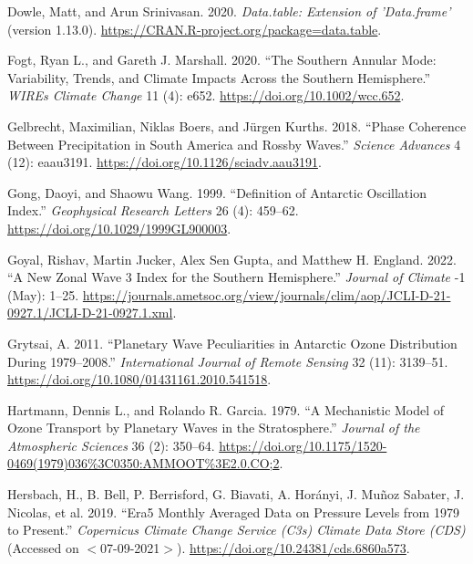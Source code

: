\documentclass[smallextended]{svjour3}       %
\newlength{\cslhangindent}
\newlength{\cslentryspacingunit} %
\newenvironment{CSLReferences}[2] %
 {%
  \setlength{\parindent}{0pt}
  \ifodd #1
  \let\oldpar\par
  \def\par{\hangindent=\cslhangindent\oldpar}
  \fi
  \setlength{\parskip}{#2\cslentryspacingunit}
 }%
 {}
\begin{document}
\begin{CSLReferences}{1}{0}
\leavevmode{}%
Dowle, Matt, and Arun Srinivasan. 2020. \emph{Data.table: {Extension} of 'Data.frame'} (version 1.13.0). \url{https://CRAN.R-project.org/package=data.table}.

\leavevmode{}%
Fogt, Ryan L., and Gareth J. Marshall. 2020. {``The {Southern Annular Mode}: {Variability}, Trends, and Climate Impacts Across the {Southern Hemisphere}.''} \emph{WIREs Climate Change} 11 (4): e652. \url{https://doi.org/10.1002/wcc.652}.

\leavevmode{}%
Gelbrecht, Maximilian, Niklas Boers, and Jürgen Kurths. 2018. {``Phase Coherence Between Precipitation in {South America} and {Rossby} Waves.''} \emph{Science Advances} 4 (12): eaau3191. \url{https://doi.org/10.1126/sciadv.aau3191}.

\leavevmode{}%
Gong, Daoyi, and Shaowu Wang. 1999. {``Definition of {Antarctic Oscillation} Index.''} \emph{Geophysical Research Letters} 26 (4): 459--62. \url{https://doi.org/10.1029/1999GL900003}.

\leavevmode{}%
Goyal, Rishav, Martin Jucker, Alex Sen Gupta, and Matthew H. England. 2022. {``A New Zonal Wave 3 Index for the {Southern Hemisphere}.''} \emph{Journal of Climate} -1 (May): 1--25. \url{https://journals.ametsoc.org/view/journals/clim/aop/JCLI-D-21-0927.1/JCLI-D-21-0927.1.xml}.

\leavevmode{}%
Grytsai, A. 2011. {``Planetary Wave Peculiarities in {Antarctic} Ozone Distribution During 1979--2008.''} \emph{International Journal of Remote Sensing} 32 (11): 3139--51. \url{https://doi.org/10.1080/01431161.2010.541518}.

\leavevmode{}%
Hartmann, Dennis L., and Rolando R. Garcia. 1979. {``A {Mechanistic Model} of {Ozone Transport} by {Planetary Waves} in the {Stratosphere}.''} \emph{Journal of the Atmospheric Sciences} 36 (2): 350--64. \url{https://doi.org/10.1175/1520-0469(1979)036\%3C0350:AMMOOT\%3E2.0.CO;2}.

\leavevmode{}%
Hersbach, H., B. Bell, P. Berrisford, G. Biavati, A. Horányi, J. Muñoz Sabater, J. Nicolas, et al. 2019. {``{Era5} Monthly Averaged Data on Pressure Levels from 1979 to Present.''} \emph{{Copernicus Climate Change Service} ({C3s}) {Climate Data Store} ({CDS})} (Accessed on {\(<\)}07-09-2021{\(>\)}). \url{https://doi.org/10.24381/cds.6860a573}.


\end{CSLReferences}
\end{document}
